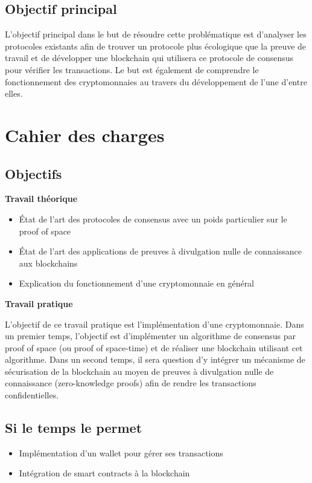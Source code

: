 \subsection*{Objectif principal}

L'objectif principal dans le but de résoudre cette problématique est d'analyser les protocoles existants afin de trouver un protocole plus écologique que la preuve de travail et de développer une blockchain qui utilisera ce protocole de consensus pour vérifier les transactions. Le but est également de comprendre le fonctionnement des cryptomonnaies au travers du développement de l'une d'entre elles.

\section*{Cahier des charges}

\subsection*{Objectifs}

\textbf{Travail théorique}
\begin{itemize}
    \item État de l'art des protocoles de consensus avec un poids particulier sur le proof of space
    \item État de l'art des applications de preuves à divulgation nulle de connaissance aux blockchains
    \item Explication du fonctionnement d'une cryptomonnaie en général
\end{itemize}

\textbf{Travail pratique}

L'objectif de ce travail pratique est l'implémentation d'une cryptomonnaie.
Dans un premier temps, l'objectif est d'implémenter un algorithme de consensus par proof of space (ou proof of space-time) et de réaliser une blockchain utilisant cet algorithme.
Dans un second temps, il sera question d'y intégrer un mécanisme de sécurisation de la blockchain au moyen de preuves à divulgation nulle de connaissance (zero-knowledge proofs) afin de rendre les transactions confidentielles.

\subsection*{Si le temps le permet}

\begin{itemize}
    \item Implémentation d'un wallet pour gérer ses transactions
    \item Intégration de smart contracts à la blockchain
\end{itemize}


